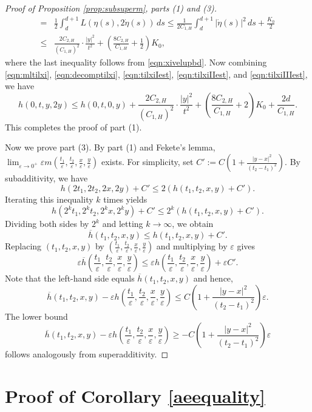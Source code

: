 \documentclass[reqno,11pt]{amsart}
\numberwithin{equation}{section}
\newcommand{\e}{\varepsilon}
\newcommand{\ep}{\varepsilon}
\renewcommand{\bar}{\overline}
\begin{document}
\begin{proof}[Proof of Proposition \ref{prop:subsuperm}, parts (1) and (3)]
\begin{equation}
\begin{aligned}
= & \frac{1}{2}\int_d^{d+1} L\left(\eta\left(s\right), 2\dot{\eta}\left(s\right)\right) \, ds \leq  \frac{1}{2C_{1,H}} \int_d^{d+1} \left|\dot{\eta}(s)\right|^2 \,ds+\frac{K_0}{2}\\
\leq & \frac{2C_{2, H}}{\left(C_{1, H}\right)^2} \cdot \frac{|y|^2}{t^2}+ \left(\frac{8C_{2,H}}{C_{1,H}}+\frac{1}{2}\right) K_0,
\end{aligned}
\end{equation}
where the last inequality follows from \eqref{eqn:xivelupbd}. Now combining \eqref{eqn:mltilxi}, \eqref{eqn:decomptilxi}, \eqref{eqn:tilxiIest}, \eqref{eqn:tilxiIIest}, and \eqref{eqn:tilxiIIIest}, we have
\[
h(0,t,y,2y) \leq h(0,t,0,y)+ \frac{2C_{2,H}}{(C_{1,H})^2}\cdot \frac{|y|^2}{t^2}+\left(\frac{8C_{2,H}}{C_{1,H}}+2\right) K_0 + \frac{2d}{C_{1, H}}.
\]
This completes the proof of part (1).

Now we prove part (3). By part (1) and Fekete's lemma, $\lim_{\ep \to 0^+} \ep m\left(\frac{t_1}{\ep}, \frac{t_2}{\ep}, \frac{x}{\ep},\frac{y}{\ep}\right)$ exists. For simplicity, set $C':=C\left(1+
\frac{|y-x|^2}{(t_2-t_1)^2}\right)$. By subadditivity, we have
\[h(2t_1,2t_2, 2x, 2y)+C' \leq 2 (h(t_1, t_2, x, y)+C').\]
Iterating this inequality $k$ times yields
\[h \left(2^k t_1,2^k t_2, 2^k x, 2^k y\right) +C' \leq 2^k \left(h(t_1,t_2, x, y)+C'\right).\]
Dividing both sides by $2^k$ and letting $k \to \infty$, we obtain
\[\bar{h}(t_1,t_2, x, y) \leq h(t_1,t_2, x, y)+C'.\]
Replacing $(t_1,t_2, x, y)$ by $\left(\frac{t_1}{\e}, \frac{t_2}{\e},\frac{x}{\e}, \frac{y}{\e}\right)$ and multiplying by $\ep$ gives
\[\e \bar{h} \left(\frac{t_1}{\e},\frac{t_2}{\e}, \frac{x}{\e}, \frac{y}{\e}\right) \leq \e h \left(\frac{t_1}{\e},\frac{t_2}{\e}, \frac{x}{\e}, \frac{y}{\e}\right)+\e C'.\]
Note that the left-hand side equals $\bar{h}(t_1,t_2, x, y)$ and hence,
\[\bar{h}(t_1,t_2, x, y)-\e h\left(\frac{t_1}{\e},\frac{t_2}{\e}, \frac{x}{\e}, \frac{y}{\e}\right)\leq C\left(1+
\frac{|y-x|^2}{(t_2-t_1)^2}\right)\ep.\]
The lower bound
\[\bar{h}(t_1,t_2, x, y)-\e h\left(\frac{t_1}{\e},\frac{t_2}{\e}, \frac{x}{\e}, \frac{y}{\e}\right)\geq -C\left(1+
\frac{|y-x|^2}{(t_2-t_1)^2}\right)\ep\]
follows analogously from superadditivity.
\end{proof}

\section{Proof of Corollary \ref{aeequality}}\label{Corapp}
\end{document}

